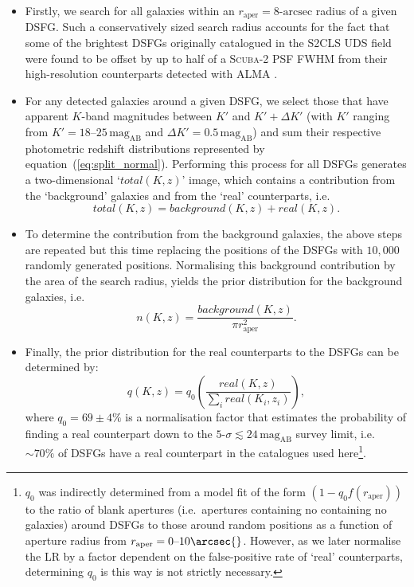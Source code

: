 \documentclass[a4paper, fleqn, usenatbib]{mnras}
\newcommand{\magab}{\text{mag}_{\text{AB}}}
\newcommand{\scuba}{\mbox{\textsc{Scuba}-2}}
\begin{document}
\begin{itemize}
    \item Firstly, we search for all galaxies within an $r_{\text{aper}}=8\text{-}\text{arcsec}$ radius of a given DSFG.
    Such a conservatively sized search radius accounts for the fact that some of the brightest DSFGs originally catalogued in the S2CLS UDS field were found to be offset by up to half of a \scuba{} PSF FWHM from their high-resolution counterparts detected with ALMA \citep[i.e.\ by as much as $\theta/2\approx8\arcsec{}$ ---][]{simpson15}.
    \item For any detected galaxies around a given DSFG, we select those that have apparent $K$-band magnitudes between $K'$ and $K'+\Delta K'$ (with $K'$ ranging from $K'=18\text{--}25\,\magab{}$ and $\Delta K'=0.5\,\magab{}$) and sum their respective photometric redshift distributions represented by equation~(\ref{eq:split_normal}).
    Performing this process for all DSFGs generates a two-dimensional `$total(K,z)$' image, which contains a contribution from the `background' galaxies and from the `real' counterparts, i.e.\ $$total(K,z)=background(K,z)+real(K,z).$$
    \item To determine the contribution from the background galaxies, the above steps are repeated but this time replacing the positions of the DSFGs with $10{,}000$ randomly generated positions.
    Normalising this background contribution by the area of the search radius, yields the prior distribution for the background galaxies, i.e.\ $$n(K,z) = \frac{background(K,z)}{\pi r_{\text{aper}} ^ 2}.$$
    \item Finally, the prior distribution for the real counterparts to the DSFGs can be determined by: $$q(K,z) = q_0\left(\frac{real(K,z)}{\sum_i real(K_i,z_i)}\right),$$
    where $q_0=69\pm4\%$ is a normalisation factor that estimates the probability of finding a real counterpart down to the $5\text{-}\sigma\lesssim24\,\magab{}$ survey limit, i.e.\ $\sim70\%$ of DSFGs have a real counterpart in the catalogues used here\footnote{$q_0$ was indirectly determined from a model fit of the form $(1-q_0f(r_{\text{aper}}))$ to the ratio of blank apertures (i.e.\ apertures containing no containing no galaxies) around DSFGs to those around random positions as a function of aperture radius from $r_{\text{aper}}=0\text{--}10\arcsec{}$.
        However, as we later normalise the LR by a factor dependent on the false-positive rate of `real' counterparts, determining $q_0$ is this way is not strictly necessary.}.
\end{itemize}
\end{document}
